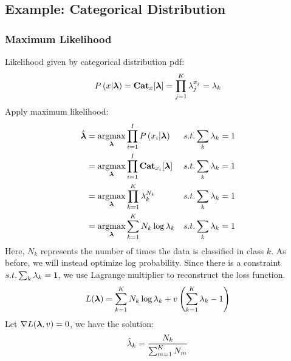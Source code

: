 \subsection{Example: Categorical Distribution}

\subsubsection*{Maximum Likelihood}
Likelihood given by categorical distribution pdf:
	\begin{align*}
	P\left(x|\boldsymbol{\lambda}\right)=\mathbf{Cat}_x[\boldsymbol{\lambda}]=\prod_{j=1}^K\lambda_j^{x_j}=\lambda_k
	\end{align*}
Apply maximum likelihood:
	\begin{align*}
	\hat{\vec{\la}}&=\argmax_{\vec{\la}}\prod_{i=1}^I\P{x_i|\vec{\la}} && \text{$s.t. \sum_k\la_k=1$} \\
	&=\argmax_{\vec{\la}}\prod_{i=1}^I\Cat_{x_i}[\vec{\la}] && \text{$s.t. \sum_k\la_k=1$} \\
	&=\argmax_{\vec{\la}}\prod_{k=1}^K\la_k^{N_k} && \text{$s.t. \sum_k\la_k=1$} \\
	&=\argmax_{\vec{\la}}\sum_{k=1}^KN_k\log\la_k && \text{$s.t. \sum_k\la_k=1$}
	\end{align*}
Here, $N_k$ represents the number of times the data is classified in class $k$. As before, we will instead optimize log probability. Since there is a constraint $s.t. \sum_k\lambda_k=1$, we use Lagrange multiplier to reconstruct the loss function.
	\begin{align*}
	L(\boldsymbol{\lambda})=\sum_{k=1}^KN_k\log\lambda_k+v\left(\sum_{k=1}^K\lambda_k-1\right)
	\end{align*}
Let $\nabla L(\boldsymbol{\lambda},v)=0$, we have the solution:
	\begin{align*}
	\hat{\lambda}_k=\frac{N_k}{\sum_{m=1}^KN_m}
	\end{align*}

